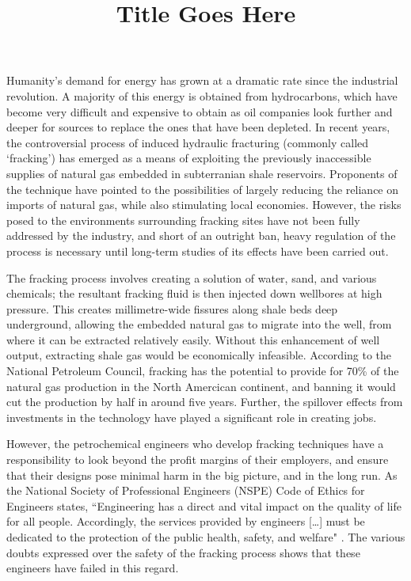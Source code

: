 \documentclass[12pt,letterpaper]{article}
\title{Title Goes Here}
\begin{document}
\makeheader

Humanity's demand for energy has grown at a dramatic rate since the industrial revolution. A majority of this energy is obtained from hydrocarbons, which have become very difficult and expensive to obtain as oil companies look further and deeper for sources to replace the ones that have been depleted. In recent years, the controversial process of induced hydraulic fracturing (commonly called `fracking') has emerged as a means of exploiting the previously inaccessible supplies of natural gas embedded in subterranian shale reservoirs. Proponents of the technique have pointed to the possibilities of largely reducing the reliance on imports of natural gas, while also stimulating local economies. However, the risks posed to the environments surrounding fracking sites have not been fully addressed by the industry, and short of an outright ban, heavy regulation of the process is necessary until long-term studies of its effects have been carried out.

The fracking process involves creating a solution of water, sand, and various chemicals; the resultant fracking fluid is then injected down wellbores at high pressure. This creates millimetre-wide fissures along shale beds deep underground, allowing the embedded natural gas to migrate into the well, from where it can be extracted relatively easily. Without this enhancement of well output, extracting shale gas would be economically infeasible. According to the National Petroleum Council, fracking has the potential to provide for 70\%  \cite{npc}  of the natural gas production in the North Amercican continent, and banning it would cut the production by half in around five years. Further, the spillover effects from investments in the technology have played a significant role in creating jobs.

However, the petrochemical engineers who develop fracking techniques have a responsibility to look beyond the profit margins of their employers, and ensure that their designs pose minimal harm in the big picture, and in the long run. As the National Society of Professional Engineers (NSPE) Code of Ethics for Engineers states, ``Engineering has a direct and vital impact on the quality of life for all people. Accordingly, the services provided by engineers [\ldots] must be dedicated to the protection of the public health, safety, and welfare" \cite{ethics}. The various doubts expressed over the safety of the fracking process shows that these engineers have failed in this regard.
\end{document}
